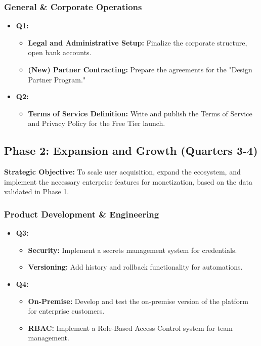 \documentclass[11pt, a4paper, oneside]{article}
\begin{document}
\subsubsection*{General \& Corporate Operations}
\begin{itemize}[leftmargin=*]
    \item \textbf{Q1:}
    \begin{itemize}
        \item \textbf{Legal and Administrative Setup:} Finalize the corporate structure, open bank accounts.
        \item \textbf{(New) Partner Contracting:} Prepare the agreements for the "Design Partner Program."
    \end{itemize}
    \item \textbf{Q2:}
    \begin{itemize}
        \item \textbf{Terms of Service Definition:} Write and publish the Terms of Service and Privacy Policy for the Free Tier launch.
    \end{itemize}
\end{itemize}

\clearpage

\subsection{Phase 2: Expansion and Growth (Quarters 3-4)}
\textbf{Strategic Objective:} To scale user acquisition, expand the ecosystem, and implement the necessary enterprise features for monetization, based on the data validated in Phase 1.

\subsubsection*{Product Development \& Engineering}
\begin{itemize}[leftmargin=*]
    \item \textbf{Q3:}
    \begin{itemize}
        \item \textbf{Security:} Implement a secrets management system for credentials.
        \item \textbf{Versioning:} Add history and rollback functionality for automations.
    \end{itemize}
    \item \textbf{Q4:}
    \begin{itemize}
        \item \textbf{On-Premise:} Develop and test the on-premise version of the platform for enterprise customers.
        \item \textbf{RBAC:} Implement a Role-Based Access Control system for team management.
    \end{itemize}
\end{itemize}
\end{document}
